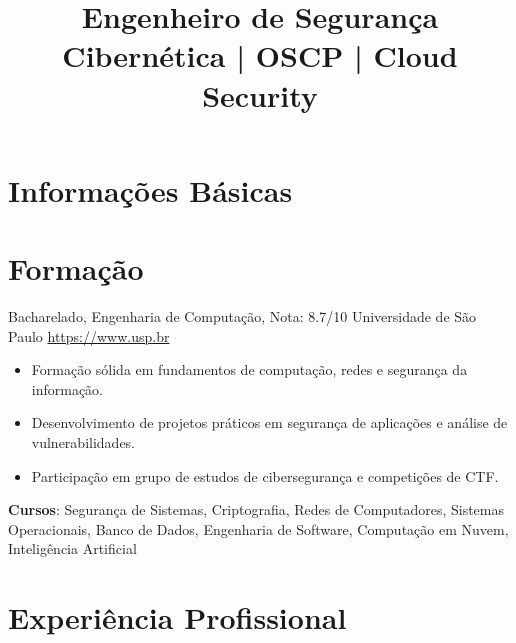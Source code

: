 \documentclass[a4paper, serif, 10pt]{moderncv}
\title{Engenheiro de Segurança Cibernética | OSCP | Cloud Security}
\begin{document}
\maketitle

\section{Informações Básicas}

\section{Formação}

        {Bacharelado, Engenharia de Computação, Nota: 8.7/10}
        {Universidade de São Paulo}
        {\url{https://www.usp.br}}
        {}
        {\begin{itemize}
\item Formação sólida em fundamentos de computação, redes e segurança da informação.
\item Desenvolvimento de projetos práticos em segurança de aplicações e análise de vulnerabilidades.
\item Participação em grupo de estudos de cibersegurança e competições de CTF.
\end{itemize}
\textbf{Cursos}: Segurança de Sistemas, Criptografia, Redes de Computadores, Sistemas Operacionais, Banco de Dados, Engenharia de Software, Computação em Nuvem, Inteligência Artificial}
\section{Experiência Profissional}
\end{document}
